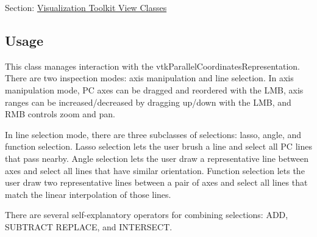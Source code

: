 Section\-: \hyperlink{sec_vtkviews}{Visualization Toolkit View Classes} \hypertarget{vtkwidgets_vtkxyplotwidget_Usage}{}\subsection{Usage}\label{vtkwidgets_vtkxyplotwidget_Usage}
This class manages interaction with the vtk\-Parallel\-Coordinates\-Representation. There are two inspection modes\-: axis manipulation and line selection. In axis manipulation mode, P\-C axes can be dragged and reordered with the L\-M\-B, axis ranges can be increased/decreased by dragging up/down with the L\-M\-B, and R\-M\-B controls zoom and pan.

In line selection mode, there are three subclasses of selections\-: lasso, angle, and function selection. Lasso selection lets the user brush a line and select all P\-C lines that pass nearby. Angle selection lets the user draw a representative line between axes and select all lines that have similar orientation. Function selection lets the user draw two representative lines between a pair of axes and select all lines that match the linear interpolation of those lines.

There are several self-\/explanatory operators for combining selections\-: A\-D\-D, S\-U\-B\-T\-R\-A\-C\-T R\-E\-P\-L\-A\-C\-E, and I\-N\-T\-E\-R\-S\-E\-C\-T.


